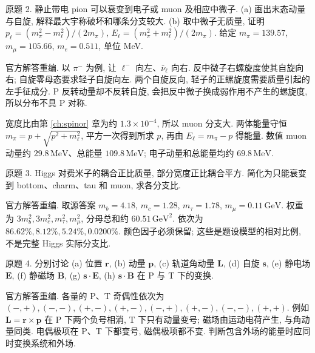 \begin{exercise}\label{ex:8701-1-2}
原题 2. 静止带电 pion 可以衰变到电子或 muon 及相应中微子. (a) 画出末态动量与自旋, 解释最大宇称破坏和哪条分支较大. (b) 取中微子无质量, 证明 $p_\ell=(m_\pi^2-m_\ell^2)/(2m_\pi)$, $E_\ell=(m_\pi^2+m_\ell^2)/(2m_\pi)$. 给定 $m_\pi=139.57$, $m_\mu=105.66$, $m_e=0.511$, 单位 MeV.
\end{exercise}
\begin{solution}
官方解答重编. 以 $\pi^-$ 为例, 让 $\ell^-$ 向左、$\bar\nu_\ell$ 向右. 反中微子右螺旋度使其自旋向右; 自旋零母态要求轻子自旋向左. 两个自旋反向, 轻子的正螺旋度需要质量引起的左手征成分. P 反转动量却不反转自旋, 会把反中微子换成弱作用不产生的螺旋度, 所以分布不具 P 对称.
\begin{center}\end{center}
宽度比由第 \ref{ch:spinor} 章为约 $1.3\times10^{-4}$, 所以 muon 分支大. 两体能量守恒 $m_\pi=p+\sqrt{p^2+m_\ell^2}$, 平方一次得到所求 $p$, 再由 $E_\ell=m_\pi-p$ 得能量. 数值 muon 动量约 $29.8\,\mathrm{MeV}$、总能量 $109.8\,\mathrm{MeV}$; 电子动量和总能量均约 $69.8\,\mathrm{MeV}$.
\end{solution}

\begin{exercise}\label{ex:8701-1-3}
原题 3. Higgs 对费米子的耦合正比质量, 部分宽度正比耦合平方. 简化为只能衰变到 bottom、charm、tau 和 muon, 求各分支比.
\end{exercise}
\begin{solution}
官方解答重编. 取源答案 $m_b=4.18$, $m_c=1.28$, $m_\tau=1.78$, $m_\mu=0.11\,\mathrm{GeV}$. 权重为 $3m_b^2,3m_c^2,m_\tau^2,m_\mu^2$, 分母总和约 $60.51\,\mathrm{GeV}^2$. 依次为 $86.62\%,8.12\%,5.24\%,0.0200\%$. 颜色因子必须保留; 这些是题设模型的相对比例, 不是完整 Higgs 实际分支比.
\end{solution}

\begin{exercise}\label{ex:8701-1-4}
原题 4. 分别讨论 (a) 位置 $\mathbf r$, (b) 动量 $\mathbf p$, (c) 轨道角动量 $\mathbf L$, (d) 自旋 $\mathbf s$, (e) 静电场 $\mathbf E$, (f) 静磁场 $\mathbf B$, (g) $\mathbf s\cdot\mathbf E$, (h) $\mathbf s\cdot\mathbf B$ 在 P 与 T 下的变换.
\end{exercise}
\begin{solution}
官方解答重编. 各量的 P、T 奇偶性依次为
$( -,+),(-,-),(+,-),(+,-),(-,+),(+,-),(-,-),(+,+)$.
例如 $\mathbf L=\mathbf r\times\mathbf p$ 在 P 下两个负号相消, T 下只有动量变号; 磁场由运动电荷产生, 与角动量同类. 电偶极项在 P、T 下都变号, 磁偶极项都不变. 判断包含外场的能量时应同时变换系统和外场.
\end{solution}


